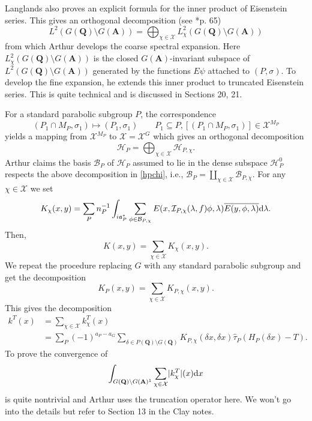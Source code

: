 \documentclass[11pt]{amsart}
\def\apg{a_{P} - a_{G}}
\def\A{\mathbf A}
\def\Q{\mathbf Q}
\def\BBB{\mathcal B}
\def\HHH{\mathcal H}
\def\III{\mathcal I}
\def\XXX{\mathcal X}
\def\aaa{\mathfrak a}
\def\d{\text d}
\def\bs{\setminus} 			%
\def\Ltwo{L^2}
\def\mod#1{\lvert #1 \rvert} %
\theoremstyle{remark}
\begin{document}
Langlands also proves an explicit formula for the inner product of Eisenstein series. This gives an orthogonal decomposition (see \cite{clay}*{p. 65})
\begin{equation} \label{hpchi}
	\Ltwo(G(\Q)\bs G(\A)) = \bigoplus_{\chi \in \XXX} \Ltwo_\chi(G(\Q)\bs G(\A))
\end{equation}
from which Arthur develops the coarse spectral expansion. Here $\Ltwo_\chi(G(\Q)\bs G(\A))$ is the closed $G(\A)$-invariant subspace of $\Ltwo(G(\Q)\bs G(\A))$ generated by the functions $E\psi$ attached to $(P, \sigma)$. To develop the fine expansion, he extends this inner product to truncated Eisenstein series. This is quite technical and is discussed in Sections 20, 21. 

For a standard parabolic subgroup $P$, the correspondence
\[ (P_1\cap M_P, \sigma_1) \mapsto (P_1, \sigma_1) \qquad P_1 \subseteq P, [(P_1 \cap M_P, \sigma_1)] \in \XXX^{M_P} \]
yields a mapping from $\XXX^{M_P}$ to $\XXX = \XXX^G$ which gives an orthogonal decomposition
\[ \HHH_P = \bigoplus_{\chi \in \XXX} \HHH_{P, \chi}. \]
Arthur claims the basis $\BBB_P$ of $\HHH_P$ assumed to lie in the dense subspace $\HHH_P^0$ respects the above decomposition in \cref{hpchi}, i.e., $\BBB_P = \coprod_{\chi \in \XXX} \BBB_{P, \chi}$. For any $\chi \in \XXX$ we set
\[ K_\chi(x, y) = \sum_P n_P^{-1} \int_{i\aaa_P^*} \sum_{\phi \in \BBB_{P, \chi}}
		E(x, \III_{P, \chi}(\lambda, f)\phi, \lambda) \overline{E(y, \phi, \lambda)} \d \lambda. \]
Then,
\[ K(x, y) = \sum_{\chi \in \XXX} K_\chi(x, y). \]
We repeat the procedure replacing $G$ with any standard parabolic subgroup and get the decomposition 
\[ K_P(x, y) = \sum_{\chi \in \XXX} K_{P, \chi}(x, y). \]
This gives the decomposition
\begin{align*}
	k^T(x) & = \sum_{\chi \in \XXX} k_\chi^T(x) \\
			& = \sum_P (-1)^{\apg} \sum_{\delta \in P(\Q)\bs G(\Q)} K_{P, \chi}(\delta x, \delta x)
				\hat\tau_P(H_P(\delta x) - T).
\end{align*}
To prove the convergence of 
\[ \int_{G(\Q)\bs G(\A)^1} \sum_{\chi \in \XXX} \mod{k_\chi^T}(x) \d x \]
is quite nontrivial and Arthur uses the truncation operator here. We won't go into the details but refer to Section 13 in the Clay notes. 
\end{document}
